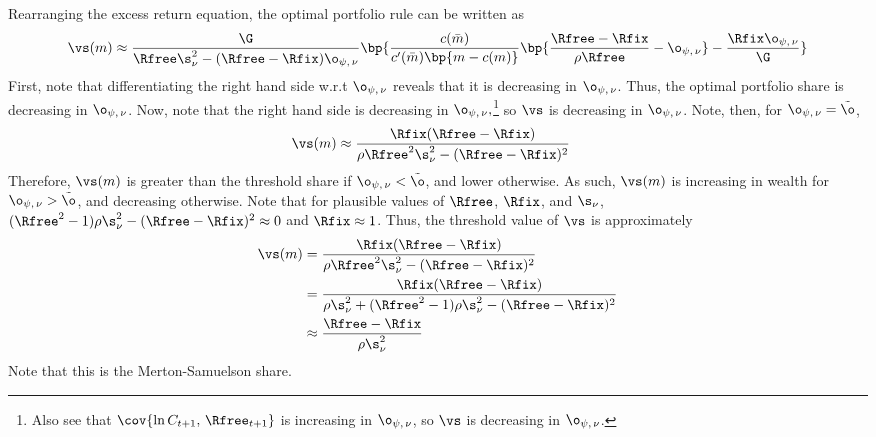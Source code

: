 Rearranging the excess return equation, the optimal portfolio rule can be written as
\[
    \vs(m) \approx \frac{\G}{\Rfree\s_{\nu}^2 - (\Rfree - \Rfix)\o_{\psi,\,\nu}}\bp{\frac{c(\bar{m})}{c'(\bar{m})\bp{m - c(m)}}\bp{\frac{\Rfree - \Rfix}{\rho\Rfree} - \o_{\psi,\,\nu}} - \frac{\Rfix\o_{\psi,\,\nu}}{\G}}
\]
First, note that differentiating the right hand side w.r.t $\o_{\psi,\,\nu}$ reveals that it is decreasing in $\o_{\psi,\,\nu}$. Thus, the optimal portfolio share is decreasing in $\o_{\psi,\,\nu}$. Now, note that the right hand side is decreasing in $\o_{\psi,\,\nu},$\footnote{Also see that $\cov{\ln C_{t+1},\,\Rfree_{t+1}}$ is increasing in $\o_{\psi,\,\nu}$, so $\vs$ is decreasing in $\o_{\psi,\,\nu}$.} so $\vs$ is decreasing in $\o_{\psi,\,\nu}$. Note, then, for $\o_{\psi,\,\nu} = \tilde{\o}$,
\begin{align*}
    \vs(m) &\approx \frac{\Rfix(\Rfree - \Rfix)}{\rho\Rfree^2\s_{\nu}^2 - (\Rfree - \Rfix)^2}
\end{align*}
Therefore, $\vs(m)$ is greater than the threshold share if $\o_{\psi,\,\nu} < \tilde{\o}$, and lower otherwise. As such, $\vs(m)$ is increasing in wealth for $\o_{\psi,\,\nu} > \tilde{\o}$, and decreasing otherwise. Note that for plausible values of $\Rfree$, $\Rfix$, and $\s_{\nu}$, $(\Rfree^2 - 1)\rho\s_{\nu}^2 - (\Rfree - \Rfix)^2 \approx 0$ and $\Rfix \approx 1$. Thus, the threshold value of $\vs$ is approximately
\begin{align*}
    \vs(m) &= \frac{\Rfix(\Rfree - \Rfix)}{\rho\Rfree^2\s_{\nu}^2 - (\Rfree - \Rfix)^2}\\
    &= \frac{\Rfix(\Rfree - \Rfix)}{\rho\s_{\nu}^2 + (\Rfree^2 - 1)\rho\s_{\nu}^2 - (\Rfree - \Rfix)^2}\\
    &\approx \frac{\Rfree - \Rfix}{\rho\s_{\nu}^2}
\end{align*}
Note that this is the Merton-Samuelson share.
